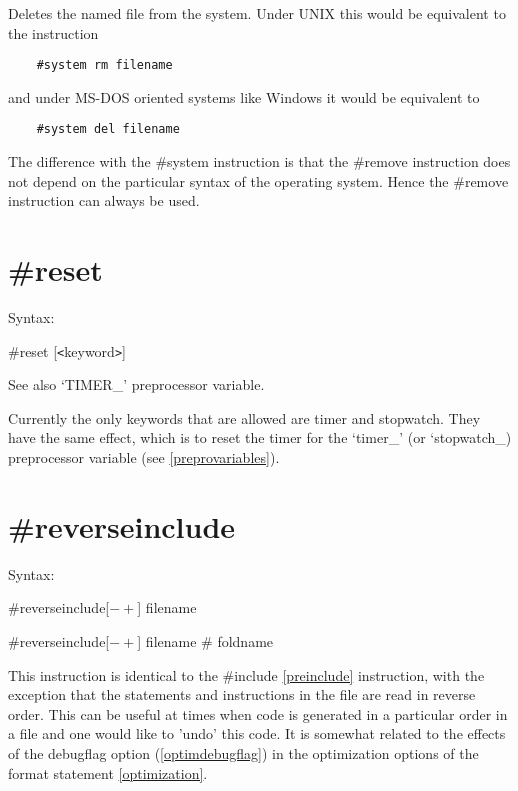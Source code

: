 \noindent Deletes the named file from the system. Under 
UNIX this would be equivalent to the instruction
\begin{verbatim}
    #system rm filename
\end{verbatim}
and under MS-DOS oriented systems like Windows 
it would be equivalent to
\begin{verbatim}
    #system del filename
\end{verbatim}
The difference with the \#system instruction is that the 
\#remove instruction does not depend on the particular 
syntax of the operating system. Hence the \#remove instruction can always 
be used.

 
\section{\#reset}
\label{prereset}

\noindent Syntax:

\#reset [{\tt<}keyword{\tt>}]

\noindent See also `TIMER\_' preprocessor variable.

\noindent Currently the only keywords that are allowed are timer and 
stopwatch. They have the same effect, which is to reset the timer for the 
`timer\_' (or `stopwatch\_) preprocessor variable (see \ref{preprovariables}).


\section{\#reverseinclude}
\label{prereverseinclude}

\noindent Syntax:

\#reverseinclude[$-+$] filename

\#reverseinclude[$-+$] filename \# foldname

\noindent This instruction is identical to the \#include \ref{preinclude} 
instruction, with the exception that the statements and instructions in the 
file are read in reverse order. This can be useful at times when code is 
generated in a particular order in a file and one would like to 'undo' this 
code. It is somewhat related to the effects of the debugflag option 
(\ref{optimdebugflag}) in the optimization options of the format statement 
\ref{optimization}.

